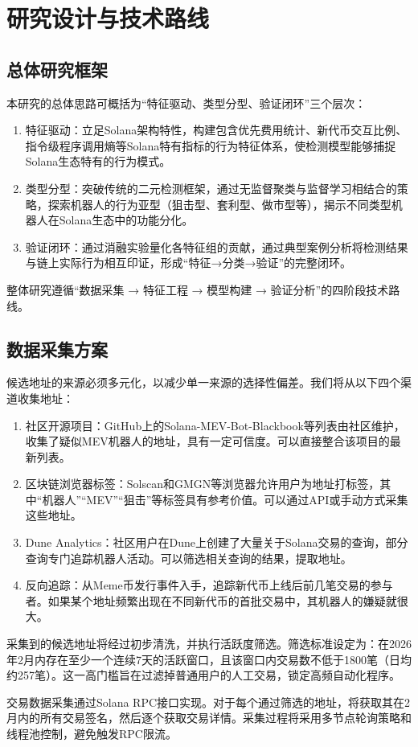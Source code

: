 \section{研究设计与技术路线}

\subsection{总体研究框架}

\par 本研究的总体思路可概括为“特征驱动、类型分型、验证闭环”三个层次：
\begin{enumerate}
    \item 特征驱动：立足Solana架构特性，构建包含优先费用统计、新代币交互比例、指令级程序调用熵等Solana特有指标的行为特征体系，使检测模型能够捕捉Solana生态特有的行为模式。
    \item 类型分型：突破传统的二元检测框架，通过无监督聚类与监督学习相结合的策略，探索机器人的行为亚型（狙击型、套利型、做市型等），揭示不同类型机器人在Solana生态中的功能分化。
    \item 验证闭环：通过消融实验量化各特征组的贡献，通过典型案例分析将检测结果与链上实际行为相互印证，形成“特征→分类→验证”的完整闭环。
\end{enumerate}
\par 整体研究遵循“数据采集 → 特征工程 → 模型构建 → 验证分析”的四阶段技术路线。

\subsection{数据采集方案}

\par 候选地址的来源必须多元化，以减少单一来源的选择性偏差。我们将从以下四个渠道收集地址：
\begin{enumerate}
    \item 社区开源项目：GitHub上的Solana-MEV-Bot-Blackbook等列表由社区维护，收集了疑似MEV机器人的地址，具有一定可信度。可以直接整合该项目的最新列表。
    \item 区块链浏览器标签：Solscan和GMGN等浏览器允许用户为地址打标签，其中“机器人”“MEV”“狙击”等标签具有参考价值。可以通过API或手动方式采集这些地址。
    \item Dune Analytics：社区用户在Dune上创建了大量关于Solana交易的查询，部分查询专门追踪机器人活动。可以筛选相关查询的结果，提取地址。
    \item 反向追踪：从Meme币发行事件入手，追踪新代币上线后前几笔交易的参与者。如果某个地址频繁出现在不同新代币的首批交易中，其机器人的嫌疑就很大。
\end{enumerate}
\par 采集到的候选地址将经过初步清洗，并执行活跃度筛选。筛选标准设定为：在2026年2月内存在至少一个连续7天的活跃窗口，且该窗口内交易数不低于1800笔（日均约257笔）。这一高门槛旨在过滤掉普通用户的人工交易，锁定高频自动化程序。
\par 交易数据采集通过Solana RPC接口实现。对于每个通过筛选的地址，将获取其在2月内的所有交易签名，然后逐个获取交易详情。采集过程将采用多节点轮询策略和线程池控制，避免触发RPC限流。

